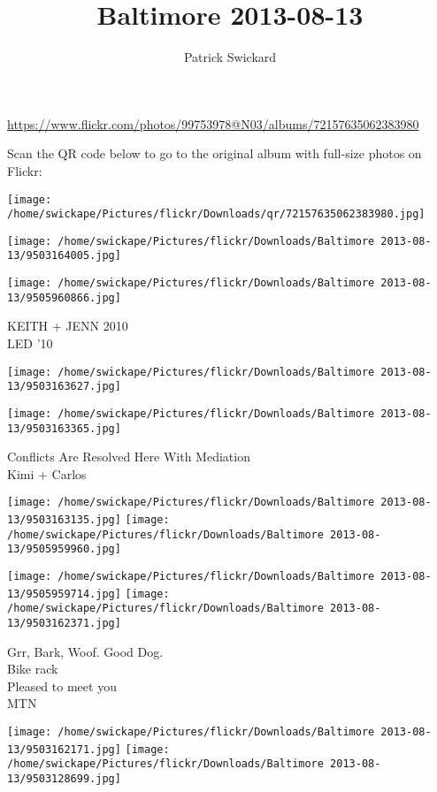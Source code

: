 \documentclass[10pt,letterpaper]{article}
\title{Baltimore 2013-08-13}
\author{Patrick Swickard}
\date{}
\begin{document}
\maketitle

\url{https://www.flickr.com/photos/99753978@N03/albums/72157635062383980}

Scan the QR code below to go to the original album with full-size photos on Flickr:

\texttt{[image: /home/swickape/Pictures/flickr/Downloads/qr/72157635062383980.jpg]}
\pagebreak

\texttt{[image: /home/swickape/Pictures/flickr/Downloads/Baltimore 2013-08-13/9503164005.jpg]}

\vspace{0.25in}
\texttt{[image: /home/swickape/Pictures/flickr/Downloads/Baltimore 2013-08-13/9505960866.jpg]}

KEITH + JENN 2010\\
LED '10
\pagebreak

\texttt{[image: /home/swickape/Pictures/flickr/Downloads/Baltimore 2013-08-13/9503163627.jpg]}

\vspace{0.25in}
\texttt{[image: /home/swickape/Pictures/flickr/Downloads/Baltimore 2013-08-13/9503163365.jpg]}

Conflicts Are Resolved Here With Mediation\\
Kimi + Carlos
\pagebreak

\texttt{[image: /home/swickape/Pictures/flickr/Downloads/Baltimore 2013-08-13/9503163135.jpg]}
\texttt{[image: /home/swickape/Pictures/flickr/Downloads/Baltimore 2013-08-13/9505959960.jpg]}

\texttt{[image: /home/swickape/Pictures/flickr/Downloads/Baltimore 2013-08-13/9505959714.jpg]}
\texttt{[image: /home/swickape/Pictures/flickr/Downloads/Baltimore 2013-08-13/9503162371.jpg]}

Grr, Bark, Woof.  Good Dog.\\
Bike rack\\
Pleased to meet you\\
MTN
\pagebreak

\texttt{[image: /home/swickape/Pictures/flickr/Downloads/Baltimore 2013-08-13/9503162171.jpg]}
\texttt{[image: /home/swickape/Pictures/flickr/Downloads/Baltimore 2013-08-13/9503128699.jpg]}
\end{document}
